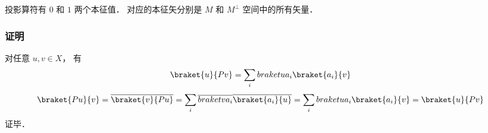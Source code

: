 投影算符有 $0$ 和 $1$ 两个本征值． 对应的本征矢分别是 $M$ 和 $M^\bot$ 空间中的所有矢量．

\subsubsection{证明}
对任意 $u, v\in X$， 有
\begin{equation}
\braket{u}{Pv} = \sum_i \\braket{u}{a_i}\braket{a_i}{v}
\end{equation}
\begin{equation}
\braket{Pu}{v} = \overline {\braket{v}{Pu}} = \sum_i \overline{\\braket{v}{a_i}}\overline{\braket{a_i}{u}} = \sum_i \\braket{u}{a_i}\braket{a_i}{v} = \braket{u}{Pv}
\end{equation}
证毕．
